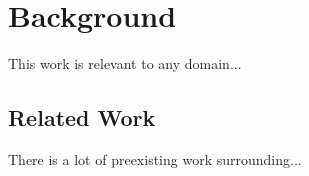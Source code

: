 
\section{Background}
\label{sec:background}

This work is relevant to any domain...
~\cite{Bateman:2015:Junk}

\subsection{Related Work}
\label{sec:related}

There is a lot of preexisting work surrounding...

